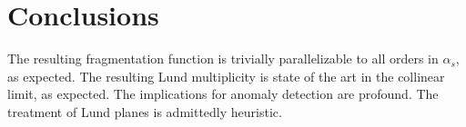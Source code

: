 \section{Conclusions}\label{sec:conclusions}

The resulting fragmentation function is trivially parallelizable to all
orders in $\alpha_s$, as expected. The resulting Lund multiplicity is
state of the art in the collinear limit, as expected. The implications
for anomaly detection are profound. The treatment of Lund planes is
admittedly heuristic.

